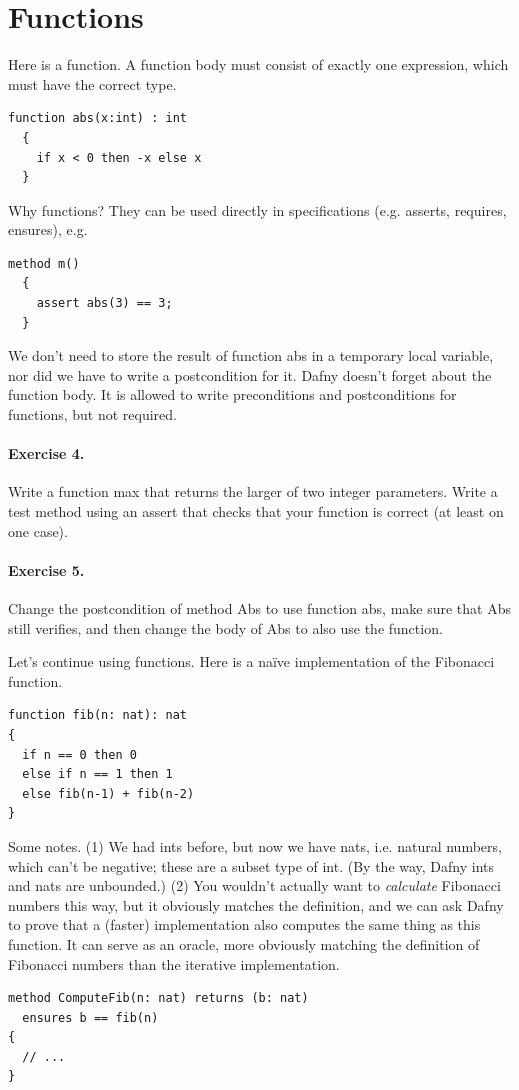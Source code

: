 \documentclass[11pt]{article}
\begin{document}

\section*{Functions}

Here is a function. A function body must consist of exactly one expression, which must have the correct type.
\begin{lstlisting}[language=dafny]
  function abs(x:int) : int
  {
    if x < 0 then -x else x
  }
\end{lstlisting}

Why functions? They can be used directly in specifications (e.g. asserts, requires, ensures), e.g.
\begin{lstlisting}[language=dafny]
  method m()
  {
    assert abs(3) == 3;
  }
\end{lstlisting}
We don't need to store the result of function \textsf{abs} in a temporary local variable, nor did we have
to write a postcondition for it. Dafny doesn't forget about the function body. It is allowed to write
preconditions and postconditions for functions, but not required.

\paragraph{Exercise 4.} Write a function \textsf{max} that returns the larger of two integer parameters.
Write a test method using an \textsf{assert} that checks that your function is correct (at least on one
case).

\paragraph{Exercise 5.} Change the postcondition of method \textsf{Abs} to use function \textsf{abs}, make sure
that \textsf{Abs} still verifies, and then change the body of \textsf{Abs} to also use the function.

Let's continue using functions. Here is a na\"ive implementation of the Fibonacci function.

\begin{lstlisting}[language=dafny]
function fib(n: nat): nat
{
  if n == 0 then 0
  else if n == 1 then 1
  else fib(n-1) + fib(n-2)
}
\end{lstlisting}

Some notes. (1) We had \textsf{int}s before, but now we have
\textsf{nat}s, i.e. natural numbers, which can't be negative; these
are a subset type of \textsf{int}. (By the way, Dafny \textsf{int}s
and \textsf{nat}s are unbounded.) (2) You wouldn't actually want to
\emph{calculate} Fibonacci numbers this way, but it obviously matches
the definition, and we can ask Dafny to prove that a (faster) implementation
also computes the same thing as this function. It can serve as an oracle,
more obviously matching the definition of Fibonacci numbers than the iterative implementation.

\begin{lstlisting}[language=dafny]
method ComputeFib(n: nat) returns (b: nat)
  ensures b == fib(n)
{
  // ...
}
\end{lstlisting}
\end{document}
